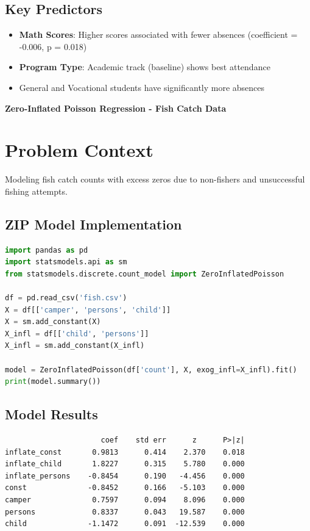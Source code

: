\documentclass[12pt, a4paper]{article}
\newcounter{problemcounter}
\newcommand{\problemtitle}[1]{%
    \vspace{1cm}
    \begin{tcolorbox}[
        colback=DeepForest!5,
        colframe=DeepForest,
        arc=15pt,
        boxrule=1.2pt,
        left=20pt,
        right=20pt,
        top=12pt,
        bottom=12pt,
        enhanced,
        attach boxed title to top center={yshift=-8pt},
        boxed title style={
            colback=AmberSunset,
            colframe=DeepForest,
            arc=10pt,
            outer arc=10pt,
            boxrule=0.8pt,
            sharp corners,
            },
        title={\color{white}\large\sffamily\bfseries \faTasks \quad PROBLEM \arabic{problemcounter}}
    ]
        \centering
        {\color{DeepForest}\Large\bfseries\sffamily #1}
    \end{tcolorbox}
    \stepcounter{problemcounter}
    \vspace{0.3cm}
}
\begin{document}
\subsection*{Key Predictors}

\begin{itemize}
    \item \textbf{Math Scores}: Higher scores associated with fewer absences (coefficient = -0.006, p = 0.018)
    \item \textbf{Program Type}: Academic track (baseline) shows best attendance
    \item General and Vocational students have significantly more absences
\end{itemize}

\newpage

\problemtitle{Zero-Inflated Poisson Regression - Fish Catch Data}

\section*{Problem Context}
Modeling fish catch counts with excess zeros due to non-fishers and unsuccessful fishing attempts.

\subsection*{ZIP Model Implementation}

\begin{lstlisting}[language=Python]
import pandas as pd
import statsmodels.api as sm
from statsmodels.discrete.count_model import ZeroInflatedPoisson

df = pd.read_csv('fish.csv')
X = df[['camper', 'persons', 'child']]
X = sm.add_constant(X)
X_infl = df[['child', 'persons']]
X_infl = sm.add_constant(X_infl)

model = ZeroInflatedPoisson(df['count'], X, exog_infl=X_infl).fit()
print(model.summary())
\end{lstlisting}

\subsection*{Model Results}

\begin{outputbox}
\begin{verbatim}
                      coef    std err      z      P>|z|
inflate_const       0.9813      0.414    2.370    0.018
inflate_child       1.8227      0.315    5.780    0.000
inflate_persons    -0.8454      0.190   -4.456    0.000
const              -0.8452      0.166   -5.103    0.000
camper              0.7597      0.094    8.096    0.000
persons             0.8337      0.043   19.587    0.000
child              -1.1472      0.091  -12.539    0.000
\end{verbatim}
\end{outputbox}
\end{document}
